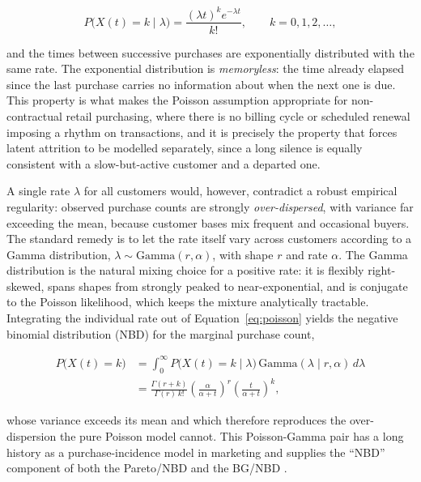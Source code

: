 \documentclass[12pt, a4paper, oneside]{report}
\begin{document}
\begin{equation}
  P\big(X(t) = k \mid \lambda\big) = \frac{(\lambda t)^k e^{-\lambda t}}{k!}, \qquad k = 0, 1, 2, \ldots,
  \label{eq:poisson}
\end{equation}

and the times between successive purchases are exponentially distributed with the same rate. The exponential distribution is \emph{memoryless}: the time already elapsed since the last purchase carries no information about when the next one is due. This property is what makes the Poisson assumption appropriate for non-contractual retail purchasing, where there is no billing cycle or scheduled renewal imposing a rhythm on transactions, and it is precisely the property that forces latent attrition to be modelled separately, since a long silence is equally consistent with a slow-but-active customer and a departed one.

A single rate $\lambda$ for all customers would, however, contradict a robust empirical regularity: observed purchase counts are strongly \emph{over-dispersed}, with variance far exceeding the mean, because customer bases mix frequent and occasional buyers. The standard remedy is to let the rate itself vary across customers according to a Gamma distribution, $\lambda \sim \text{Gamma}(r, \alpha)$, with shape $r$ and rate $\alpha$. The Gamma distribution is the natural mixing choice for a positive rate: it is flexibly right-skewed, spans shapes from strongly peaked to near-exponential, and is conjugate to the Poisson likelihood, which keeps the mixture analytically tractable. Integrating the individual rate out of Equation~\eqref{eq:poisson} yields the negative binomial distribution (NBD) for the marginal purchase count,

\begin{equation}
\begin{split}
  P\big(X(t) = k\big) &= \int_0^\infty P\big(X(t) = k \mid \lambda\big)\, \text{Gamma}(\lambda \mid r, \alpha)\, d\lambda \\
  &= \frac{\Gamma(r + k)}{\Gamma(r)\, k!} \left(\frac{\alpha}{\alpha + t}\right)^{\!r} \left(\frac{t}{\alpha + t}\right)^{\!k},
\end{split}
  \label{eq:nbd}
\end{equation}

whose variance exceeds its mean and which therefore reproduces the over-dispersion the pure Poisson model cannot. This Poisson-Gamma pair has a long history as a purchase-incidence model in marketing and supplies the ``NBD'' component of both the Pareto/NBD and the BG/NBD \parencite{schmittlein1987, fader2005}.
\end{document}
